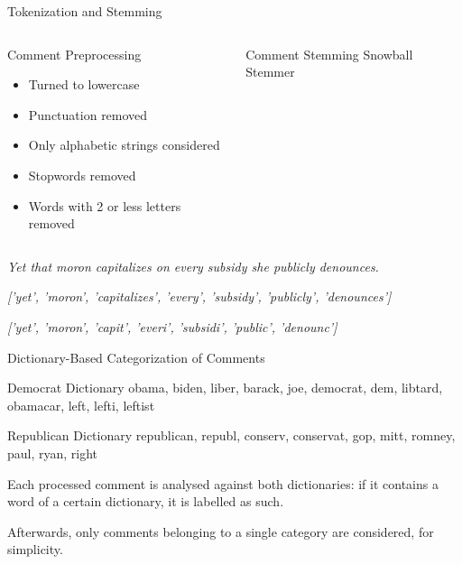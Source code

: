 \documentclass[aspectratio=169,notes]{beamer}
\begin{document}
\begin{frame}{Tokenization and Stemming}
\begin{columns}
 
\begin{column}{.5\textwidth}
 \begin{block}{Comment Preprocessing}
 \begin{itemize}
  \item Turned to lowercase
  \item Punctuation removed
  \item Only alphabetic strings considered
  \item Stopwords removed
  \item Words with 2 or less letters removed
 \end{itemize}
 \end{block}
\end{column}

\begin{column}{.5\textwidth}
 \begin{block}{Comment Stemming}
  Snowball Stemmer
 \end{block}
\end{column}
\end{columns}
\textit{Yet that moron capitalizes on every subsidy she publicly denounces.}

\textit{['yet', 'moron', 'capitalizes', 'every', 'subsidy', 'publicly', 'denounces']}

\textit{['yet', 'moron', 'capit', 'everi', 'subsidi', 'public', 'denounc']}
\end{frame}

\begin{frame}{Dictionary-Based Categorization of Comments}
\begin{exampleblock}{Democrat Dictionary}
 obama, biden, liber, barack, joe, democrat, dem, libtard, obamacar, left, lefti, leftist
\end{exampleblock}
\begin{exampleblock}{Republican Dictionary}
 republican, republ, conserv, conservat, gop, mitt, romney, paul, ryan, right
\end{exampleblock}

Each processed comment is analysed against both dictionaries: if it contains a word of a certain dictionary, it is labelled as such.

Afterwards, only comments belonging to a \alert{single category} are considered, for simplicity.
\end{frame}
\end{document}
